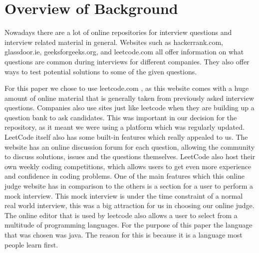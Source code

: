 \documentclass{article}
\begin{document}
\section{Overview of Background}
\par Nowadays there are a lot of online repositories for interview questions and interview related material in general. Websites such as hackerrank.com, glassdoor.ie, geeksforgeeks.org, and leetcode.com all offer information on what questions are common during interviews for different companies. They also offer ways to test potential solutions to some of the given questions. 
\par For this paper we chose to use leetcode.com \cite{leet1}, as this website comes with a huge amount of online material that is generally taken from previously asked interview questions. Companies also use sites just like leetcode when they are building up a question bank to ask candidates. This was important in our decision for the repository, as it meant we were using a platform which was regularly updated. LeetCode itself also has some built-in features which really appealed to us. The website has an online discussion forum for each question, allowing the community to discuss solutions, issues and the questions themselves. LeetCode also host their own weekly coding competitions, which allows users to get even more experience and confidence in coding problems. One of the main features which this online judge website has in comparison to the others is a section for a user to perform a mock interview. This mock interview is under the time constraint of a normal real world interview, this was a big attraction for us in choosing our online judge. The online editor that is used by leetcode also allows a user to select from a multitude of programming languages. For the purpose of this paper the language that was chosen was java. The reason for this is because it is a language most people learn first.
\end{document}
